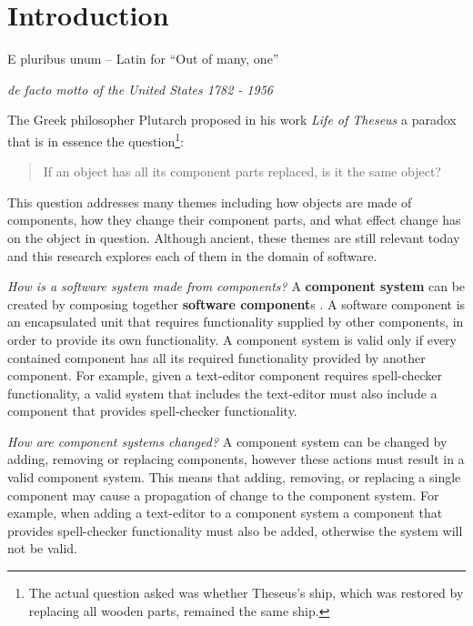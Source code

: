 \chapter{Introduction}
\label{introduction}
\epigraph{E pluribus unum -- Latin for ``Out of many, one''}
{\textit{de facto motto of the United States 1782 - 1956}}
The Greek philosopher Plutarch proposed in his work \textit{Life of Theseus} a paradox that is in essence the question\footnote{The actual question asked was whether Theseus's ship, which was restored by replacing all wooden parts, remained the same ship.}:
\begin{quote}
If an object has all its component parts replaced, is it the same object?
\end{quote}
This question addresses many themes including how objects are made of components, how they change their component parts,
and what effect change has on the object in question.
Although ancient, 
these themes are still relevant today and this research explores each of them in the domain of software.

\textit{How is a software system made from components?}
A \textbf{component system} can be created by composing together \textbf{software component}s \citep{Szyperski2002}.
A software component is an encapsulated unit that requires functionality supplied by other components, in order to provide its own functionality. 
A component system is valid only if every contained component has all its required functionality provided by another component.
For example, given a text-editor component requires spell-checker functionality, 
a valid system that includes the text-editor must also include a component that provides spell-checker functionality.


\textit{How are component systems changed?}
A component system can be changed by adding, removing or replacing components, however these actions must result in a valid component system.
This means that adding, removing, or replacing a single component may cause a propagation of change to the component system.
For example, when adding a text-editor to a component system 
a component that provides spell-checker functionality must also be added, otherwise the system will not be valid.

